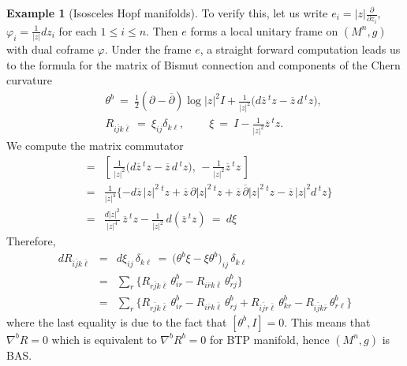 \documentclass{amsart}
\numberwithin{equation}{section}
\theoremstyle{definition}
\newtheorem{example}  [theorem]     {Example}
\renewcommand{\1}{\mathds{1}}
\renewcommand{\>}{\rightarrow}
\begin{document}
\begin{example}[Isosceles Hopf manifolds]
To verify this, let us write $e_i=|z|\frac{\partial}{\partial z_i}$, $\varphi_i = \frac{1}{|z|}dz_i$ for each $1\leq i \leq n$. Then $e$ forms a local unitary frame on $(M^n,g)$ with dual coframe $\varphi$. Under the frame $e$, a straight forward computation leads us to the formula for the matrix of Bismut connection and components of the Chern curvature
\begin{eqnarray*}
&& \theta^b \ = \ \frac{1}{2}(\partial - \overline{\partial}) \log |z|^2 I + \frac{1}{|z|^2} \big( d\overline{z} \,^t\!z - \overline{z} \,d\,^t\!z \big), \\
&&  R_{i\bar{j}k\bar{\ell}} \ = \ \xi_{ij} \delta_{k\ell}, \ \ \ \ \ \ \ \ \ \ \xi \ = \ I - \frac{1}{|z|^2} \overline{z}\,^t\!z.
\end{eqnarray*}
We compute the matrix commutator
\begin{eqnarray*}
 [\theta^b, \xi] & = & [ \, \frac{1}{|z|^2} \big( d\overline{z} \,^t\!z - \overline{z} \,d\,^t\!z \big) , \, - \frac{1}{|z|^2} \overline{z}\,^t\!z \, ] \\
 & = & \frac{1}{|z|^4} \{ -d\overline{z} \,|z|^2 \,^t\!z + \overline{z} \,\partial |z|^2 \,^t\!z + \overline{z}\, \overline{\partial} |z|^2 \,^t\!z - \overline{z}\, |z|^2 d\,^t\!z \} \\
 & = & \frac{ d|z|^2}{|z|^4} \,\overline{z} \,^t\!z - \frac{1}{|z|^2} \,d(\overline{z} \,^t\!z) \ = \ d\xi
\end{eqnarray*}
Therefore,
\begin{eqnarray*}
 dR_{i\bar{j}k\bar{\ell}}  & = & d\xi_{ij} \,\delta_{k\ell} \ = \ \big( \theta^b \xi - \xi \theta^b)_{ij} \,\delta_{k\ell} \\
 & = & \sum_r \{  R_{r\bar{j}k\bar{\ell}} \,\theta^b_{ir} -  R_{i\bar{r}k\bar{\ell}} \,\theta^b_{rj} \}  \\
 & = & \sum_r \{  R_{r\bar{j}k\bar{\ell}} \,\theta^b_{ir} -  R_{i\bar{r}k\bar{\ell}} \,\theta^b_{rj} + R_{i\bar{j}r\bar{\ell}} \,\theta^b_{kr} -  R_{i\bar{j}k\bar{r}} \,\theta^b_{r\ell } \}
\end{eqnarray*}
where the last equality is due to the fact that $[\theta^b, I]=0$. This means that $\nabla^bR=0$ which is equivalent to $\nabla^bR^b=0$ for BTP manifold, hence $(M^n,g)$ is BAS.



\end{example}
\end{document}
